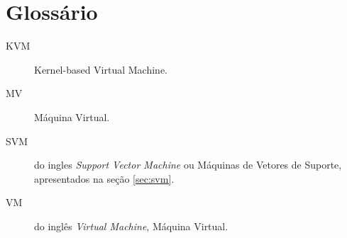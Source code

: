 %
%
\chapter{Glossário}

\begin{description}
\item[KVM] Kernel-based Virtual Machine.
\item[MV] Máquina Virtual.
\item[SVM] do ingles \emph{Support Vector Machine} ou Máquinas de Vetores
de Suporte, apresentados na seção \ref{sec:svm}.
\item[VM] do inglês \emph{Virtual Machine}, Máquina Virtual.
\end{description}
